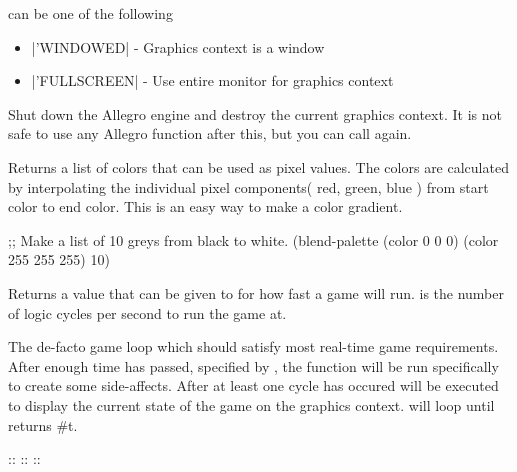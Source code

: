  can be one of the following
\begin{itemize}
	\item{\scheme|'WINDOWED| - Graphics context is a window}
	\item{\scheme|'FULLSCREEN| - Use entire monitor for graphics context}
\end{itemize}


Shut down the Allegro engine and destroy the current graphics context. It is not safe to use any Allegro function after this, but you can call  again.


Returns a list of colors that can be used as pixel values. The colors are
calculated by interpolating the individual pixel components( red, green, blue
) from start color to end color. This is an easy way to make a color gradient.

\begin{schemedisplay}
;; Make a list of 10 greys from black to white.
(blend-palette (color 0 0 0) (color 255 255 255) 10)
\end{schemedisplay}

\newline
{}

Returns a value that can be given to  for how fast a game will run.  is the number of logic cycles per second to run the game at.


The de-facto game loop which should satisfy most real-time game requirements. After enough time has passed, specified by , the  function will be run specifically to create some side-affects. After at least one  cycle has occured  will be executed to display the current state of the game on the graphics context.  will loop until  returns #t.

 :: \newline
{} :: \newline
{} :: \newline

